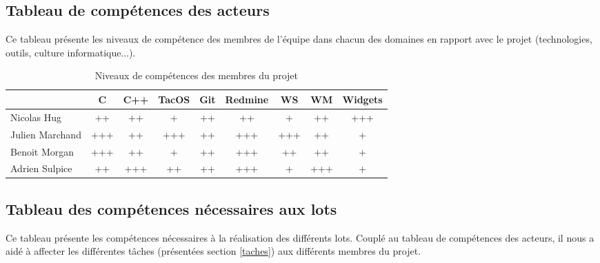 \subsection{Tableau de compétences des acteurs}

Ce tableau présente les niveaux de compétence des membres de l'équipe dans chacun des domaines en rapport avec le projet (technologies, outils, culture informatique...).

\begin{table}[h]
\centering
\begin{tabular}{|l|c|c|c|c|c|c|c|c|}
  \rowcolor{dark_grey} \hline &  C \footnotemark[1] & C++ \footnotemark[2] & TacOS & Git & Redmine & WS \footnotemark[3] & WM \footnotemark[4] & Widgets \footnotemark[5] \\
  \hline
  Nicolas Hug       &   ++    &   ++    &   +   &   ++    &   ++    &   +     &   ++    &   +++ \\
  \hline
  Julien Marchand   &   +++   &   ++    &  +++  &   ++    &   +++   &   +++   &   ++    &   + \\
  \hline
  Benoit Morgan     &   +++   &   ++    &   +   &   ++    &   +++   &   ++    &   ++    &   + \\
  \hline
  Adrien Sulpice    &   ++    &   +++   &   ++  &   ++    &   +++   &   +     &   +++   &   + \\
  \hline
\end{tabular}
\caption{Niveaux de compétences des membres du projet}
\end{table}

\subsection{Tableau des compétences nécessaires aux lots}

Ce tableau présente les compétences nécessaires à la réalisation des différents lots. Couplé au tableau de compétences des acteurs, il nous a aidé à affecter les différentes tâches (présentées section \ref{taches}) aux différents membres du projet.


